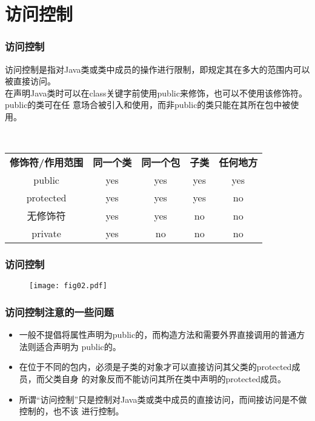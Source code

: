 \section{访问控制}
\begin{frame}[fragile] %
\frametitle{访问控制}

访问控制是指对Java类或类中成员的操作进行限制，即规定其在多大的范围内可以被直接访问。
\\
在声明Java类时可以在class关键字前使用public来修饰，也可以不使用该修饰符。public的类可在任
意场合被引入和使用，而非public的类只能在其所在包中被使用。

\\
\begin{table}
\footnotesize
\setlength{\extrarowheight}{1.2mm}
\begin{tabular}{c|c|c|c|c}
{\bf 修饰符/作用范围} & {\bf 同一个类} & {\bf 同一个包} & {\bf 子类} & {\bf 任何地方} \\
public & yes & yes & yes & yes\\
protected  & yes & yes & yes & no \\
无修饰符 & yes & yes & no & no \\
private & yes & no & no & no \\
\end{tabular}
\end{table}
\end{frame}

\begin{frame}[fragile] %
\frametitle{访问控制}

\begin{figure}
\centering
\texttt{[image: fig02.pdf]}
\end{figure}
\end{frame}

\begin{frame}[fragile] %
\frametitle{访问控制注意的一些问题}

\begin{itemize}
\item 一般不提倡将属性声明为public的，而构造方法和需要外界直接调用的普通方法则适合声明为
  public的。
\item 在位于不同的包内，必须是子类的对象才可以直接访问其父类的protected成员，而父类自身
  的对象反而不能访问其所在类中声明的protected成员。
\item 所谓“访问控制”只是控制对Java类或类中成员的直接访问，而间接访问是不做控制的，也不该
  进行控制。
\end{itemize}

\end{frame}

